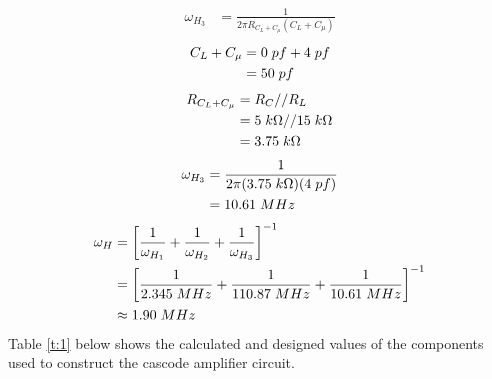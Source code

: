 \documentclass{article}
\begin{document}
	\begin{align*}
		\omega_{H_3} &= \frac{1}{2\pi R_{C_{L} + C_{\mu}} (C_{L} + C_{\mu})}
	\end{align*}
	\begin{align*}
		C_{L} + C_{\mu} &= 0 \hspace{1mm} pf + 4 \hspace{1mm} pf\\
		&= 50 \hspace{1mm} pf
	\end{align*}
	\begin{align*}
		R_{C_{L} + C_{\mu}} &= R_C // R_L\\
		&= 5 \hspace{1mm} k\Omega // 15 \hspace{1mm} k\Omega\\
		&= 3.75 \hspace{1mm} k\Omega
	\end{align*}
	\begin{align*}
		\omega_{H_3} &= \frac{1}{2\pi (3.75 \hspace{1mm} k\Omega)(4 \hspace{1mm} pf)}\\
		&= 10.61 \hspace{1mm} MHz
	\end{align*}
	\pagebreak
	\begin{align*}
		\omega_H &= \left[\frac{1}{\omega_{H_1}} + \frac{1}{\omega_{H_2}} + \frac{1}{\omega_{H_3}}\right]^{-1}\\
		&= \left[\frac{1}{2.345 \hspace{1mm} MHz} + \frac{1}{110.87 \hspace{1mm} MHz} + \frac{1}{10.61 \hspace{1mm} MHz}\right]^{-1}\\
		&\approx 1.90 \hspace{1mm} MHz
	\end{align*}
	Table \ref{t:1} below shows the calculated and designed values of the components used to construct the cascode amplifier circuit.
\end{document}
